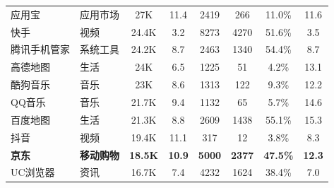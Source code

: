 \begin{ThreePartTable}
\begin{longtable}{l l c c c c c c}
        \rowcolor{gray!15} 应用宝                    & 应用市场       & 27K                        & 11.4                       & 2419           & 266                        & 11.0\%       & 11.6                       \\
        快手                                         & 视频           & 24.4K                      & 3.2                        & 8273           & 4270                       & 51.6\%       & 3.5                        \\
        \rowcolor{gray!15} 腾讯手机管家              & 系统工具       & 24.2K                      & 8.7                        & 2463           & 1340                       & 54.4\%       & 8.7                        \\
        高德地图                                     & 生活           & 24K                        & 6.5                        & 1225           & 51                         & 4.2\%        & 13.1                       \\
        \rowcolor{gray!15} 酷狗音乐                  & 音乐           & 23K                        & 8.6                        & 1313           & 122                        & 9.3\%        & 12.2                       \\
        QQ音乐                                       & 音乐           & 21.7K                      & 9.4                        & 1132           & 65                         & 5.7\%        & 14.6                       \\
        \rowcolor{gray!15} 百度地图                  & 生活           & 21.3K                      & 8.8                        & 2609           & 1438                       & 55.1\%       & 15.3                       \\
        抖音                                         & 视频           & 19.4K                      & 11.1                       & 317            & 12                         & 3.8\%        & 8.3                        \\
        \rowcolor{gray!15} {\bf 京东}\tnote{*}       & {\bf 移动购物} & {\bf 18.5K}                & {\bf 10.9}                 & {\bf 5000}     & {\bf 2377}                 & {\bf 47.5\%} & {\bf 12.3}                 \\
        UC浏览器                                     & 资讯           & 16.7K                      & 7.4                        & 4232           & 1624                       & 38.4\%       & 7.0                        \\

\end{longtable}
\end{ThreePartTable}
